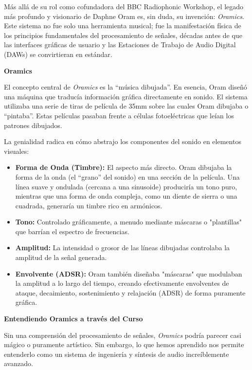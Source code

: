 \documentclass[paper=letter, fontsize=11pt, draft=false]{scrartcl}
\numberwithin{equation}{problemcounter} %
\numberwithin{figure}{problemcounter} %
\numberwithin{table}{problemcounter} %
\numberwithin{subsection}{problemcounter}
\begin{document}
Más allá de su rol como cofundadora del BBC Radiophonic Workshop, el legado más profundo y visionario de Daphne Oram es, sin duda, su invención: \textit{Oramics}. Este sistema no fue solo una herramienta musical; fue la manifestación física de los principios fundamentales del procesamiento de señales, décadas antes de que las interfaces gráficas de usuario y las Estaciones de Trabajo de Audio Digital (DAWs) se convirtieran en estándar.


\textbf{Oramics}

\noindent
El concepto central de \textit{Oramics} es la ``música dibujada''. En esencia, Oram diseñó una máquina que traducía información gráfica directamente en sonido. El sistema utilizaba una serie de tiras de película de 35mm sobre las cuales Oram dibujaba o ``pintaba''. Estas películas pasaban frente a células fotoeléctricas que leían los patrones dibujados.

La genialidad radica en cómo abstrajo los componentes del sonido en elementos visuales:

\begin{itemize}
    \item \textbf{Forma de Onda (Timbre):} El aspecto más directo. Oram dibujaba la forma de la onda (el ``grano'' del sonido) en una sección de la película. Una línea suave y ondulada (cercana a una sinusoide) produciría un tono puro, mientras que una forma de onda compleja, como un diente de sierra o una cuadrada, generaría un timbre rico en armónicos.
    \item \textbf{Tono:} Controlado gráficamente, a menudo mediante máscaras o "plantillas" que barrían el espectro de frecuencias.
    \item \textbf{Amplitud:} La intensidad o grosor de las líneas dibujadas controlaba la amplitud de la señal generada.
    \item \textbf{Envolvente (ADSR):} Oram también diseñaba "máscaras" que modulaban la amplitud a lo largo del tiempo, creando efectivamente envolventes de ataque, decaimiento, sostenimiento y relajación (ADSR) de forma puramente gráfica.
\end{itemize}

\textbf{Entendiendo Oramics a través del Curso}

Sin una comprensión del procesamiento de señales, \textit{Oramics} podría parecer casi mágico o puramente artístico. Sin embargo, lo que hemos aprendido nos permite entenderlo como un sistema de ingeniería y síntesis de audio increíblemente avanzado.
\end{document}
